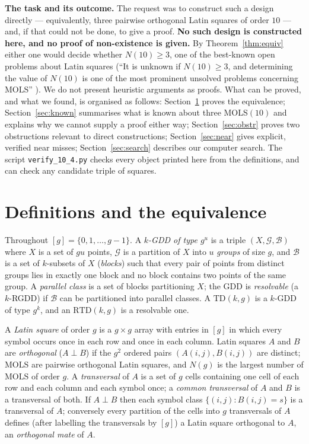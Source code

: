 \documentclass[11pt]{article}
\theoremstyle{remark}
\newcommand{\TD}{\mathrm{TD}}
\newcommand{\RTD}{\mathrm{RTD}}
\begin{document}
\medskip\noindent
\textbf{The task and its outcome.}
The request was to construct such a design directly --- equivalently, three pairwise
orthogonal Latin squares of order $10$ --- and, if that could not be done, to give a
proof.  \textbf{No such design is constructed here, and no proof of non-existence is
given.}  By Theorem~\ref{thm:equiv} either one would decide whether $N(10)\ge 3$,
one of the best-known open problems about Latin squares
(``It is unknown if $N(10)\ge 3$, and determining the value of $N(10)$ is one of the
most prominent unsolved problems concerning MOLS'' \cite[Section~1]{BKS26}).
We do not present heuristic arguments as proofs.  What can be proved, and what we
found, is organised as follows:
Section~\ref{sec:equiv} proves the equivalence;
Section~\ref{sec:known} summarises what is known about three MOLS$(10)$ and explains why
we cannot supply a proof either way;
Section~\ref{sec:obstr} proves two obstructions relevant to direct constructions;
Section~\ref{sec:near} gives explicit, verified near misses;
Section~\ref{sec:search} describes our computer search.
The script \texttt{verify\_10\_4.py} checks every object printed here from the
definitions, and can check any candidate triple of squares.

\section{Definitions and the equivalence}\label{sec:equiv}

Throughout $[g]=\{0,1,\dots,g-1\}$.
A \emph{$k$-GDD of type $g^{u}$} is a triple $(X,\mathcal G,\mathcal B)$ where $X$ is a set
of $gu$ points, $\mathcal G$ is a partition of $X$ into $u$ \emph{groups} of size $g$,
and $\mathcal B$ is a set of $k$-subsets of $X$ (\emph{blocks}) such that every pair of
points from distinct groups lies in exactly one block and no block contains two points
of the same group.  A \emph{parallel class} is a set of blocks partitioning $X$; the
GDD is \emph{resolvable} (a $k$-RGDD) if $\mathcal B$ can be partitioned into parallel
classes.  A $\TD(k,g)$ is a $k$-GDD of type $g^{k}$, and an $\RTD(k,g)$ is a resolvable
one.

A \emph{Latin square} of order $g$ is a $g\times g$ array with entries in $[g]$ in which
every symbol occurs once in each row and once in each column.  Latin squares $A$ and $B$
are \emph{orthogonal} ($A\perp B$) if the $g^{2}$ ordered pairs $(A(i,j),B(i,j))$ are
distinct; MOLS are pairwise orthogonal Latin squares, and $N(g)$ is the largest number
of MOLS of order $g$.  A \emph{transversal} of $A$ is a set of $g$ cells containing
one cell of each row and each column and each symbol once; a \emph{common transversal}
of $A$ and $B$ is a transversal of both.  If $A\perp B$ then each symbol class
$\{(i,j):B(i,j)=s\}$ is a transversal of $A$; conversely every partition of the cells
into $g$ transversals of $A$ defines (after labelling the transversals by $[g]$) a
Latin square orthogonal to $A$, an \emph{orthogonal mate} of $A$.
\end{document}
